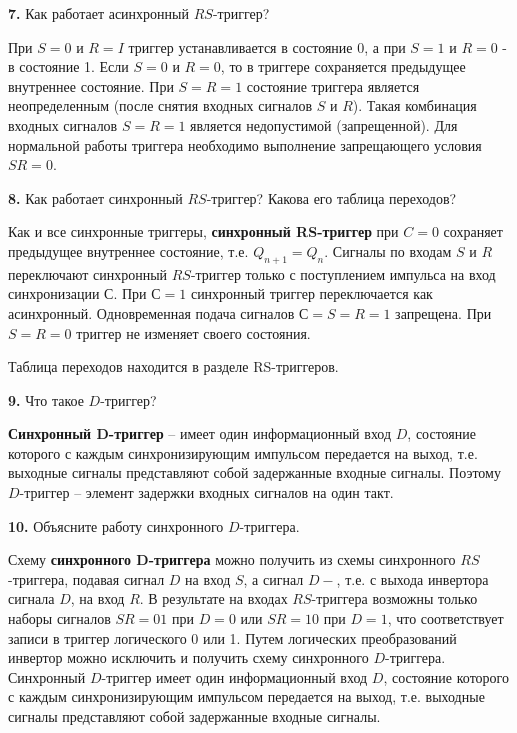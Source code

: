 \documentclass[a4paper,12pt]{article}
\begin{document}
\noindent\textbf{7.} Как работает асинхронный $RS$-триггер?\newline

\noindent При $S = 0$ и $R = I$ триггер устанавливается в состояние 0, а при $S = 1$ и $R = 0$ - в состояние 1. Если $S = 0$ и $R = 0$, то в триггере сохраняется предыдущее внутреннее состояние. 
При $S = R = 1$ состояние триггера является неопределенным (после снятия входных сигналов $S$ и $R$). Такая комбинация входных сигналов $S = R = 1$ является недопустимой (запрещенной). Для нормальной работы триггера необходимо выполнение запрещающего условия $SR = 0$.\newline

\noindent\textbf{8.} Как работает синхронный $RS$-триггер? Какова его таблица переходов? \newline

\noindent Как и все синхронные триггеры, \textbf{синхронный RS-триггер} при $C = 0$ сохраняет предыдущее внутреннее состояние, т.е. $Q_{n + 1} = Q_{n}$. Сигналы по входам $S$ и $R$ переключают синхронный $RS$-триггер только с поступлением импульса на вход синхронизации $С$. При $С = 1$ синхронный триггер переключается как асинхронный. Одновременная подача сигналов $С = S = R = 1$ запрещена. При $S = R = 0$ триггер не изменяет своего состояния.\newline

\noindent Таблица переходов находится в разделе RS-триггеров.\newline

\noindent\textbf{9.} Что такое $D$-триггер? \newline

\noindent\textbf{Синхронный D-триггер} -- имеет один информационный вход $D$, состояние которого с каждым синхронизирующим импульсом передается на выход, т.е. выходные сигналы представляют собой задержанные входные сигналы. Поэтому $D$-триггер -- элемент задержки входных сигналов на один такт.\newline

\noindent\textbf{10.} Объясните работу синхронного $D$-триггера.\newline

\noindent Схему \textbf{синхронного D-триггера} можно получить из схемы синхронного $RS$-триггера, подавая сигнал $D$ на вход $S$, а сигнал $D-$, т.е. с выхода инвертора сигнала $D$, на вход $R$. В результате на входах $RS$-триггера возможны только наборы сигналов $SR = 01$ при $D = 0$ или $SR = 10$ при $D = 1$, что соответствует записи в триггер логического 0 или 1. Путем логических преобразований инвертор можно исключить и получить схему синхронного $D$-триггера. Синхронный $D$-триггер имеет один информационный вход $D$, состояние которого с каждым синхронизирующим импульсом передается на выход, т.е. выходные сигналы представляют собой задержанные входные сигналы.\newline
\end{document}
